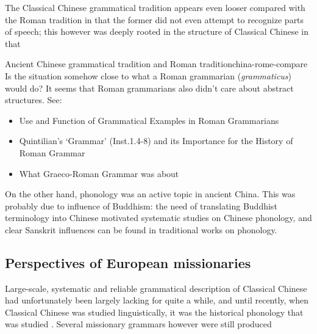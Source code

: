 \documentclass[UTF8, a4paper, oneside, scheme=plain, 12pt]{ctexrep}
\newcommand*{\citepage}[1]{p.~{#1}}
\newcommand{\form}[1]{\emph{#1}}
\begin{document}
The Classical Chinese grammatical tradition appears even looser compared with the Roman tradition
in that the former did not even attempt to recognize parts of speech;
this however was deeply rooted in the structure of Classical Chinese
in that 

\begin{todobox}{Ancient Chinese grammatical tradition and Roman tradition}{china-rome-compare}
    Is the situation somehow close to what a Roman grammarian (\form{grammaticus}) would do?
    It seems that Roman grammarians also didn't care about abstract structures.
    See:
    \begin{itemize}
        \item Use and Function of Grammatical Examples in Roman Grammarians
        \item Quintilian’s ‘Grammar’ (Inst.1.4-8) and its Importance for the History of Roman Grammar
        \item What Graeco-Roman Grammar was about
    \end{itemize}
\end{todobox}

On the other hand, phonology was an active topic in ancient China.
This was probably due to influence of Buddhism: 
the need of translating Buddhist terminology into Chinese motivated systematic studies on Chinese phonology, and clear Sanskrit influences can be found in traditional works on phonology.

\subsection{Perspectives of European missionaries}

Large-scale, systematic and reliable grammatical description of Classical Chinese had unfortunately been largely lacking for quite a while, and until recently, when Classical Chinese was studied linguistically, it was the historical phonology that was studied \citep[\citepage{xiii}]{pulleyblank1995outline}.
Several missionary grammars however were still produced 
\end{document}
